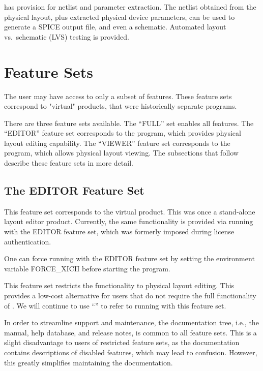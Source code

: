 {\Xic} has provision for netlist and parameter extraction.  The
netlist obtained from the physical layout, plus extracted physical
device parameters, can be used to generate a SPICE output file, and
even a schematic.  Automated layout vs.~schematic (LVS) testing is
provided.

\section{{\Xic} Feature Sets}

The {\Xic} user may have access to only a subset of features.  These
feature sets correspond to "virtual" products, that were historically
separate programs.

There are three feature sets available.  The ``{\vt FULL}'' set enables
all {\Xic} features.  The ``{\vt EDITOR}'' feature set corresponds to the
{\XicII} program, which provides physical layout editing capability.
The ``{\vt VIEWER}'' feature set corresponds to the {\Xiv} program, which
allows physical layout viewing.  The subsections that follow describe these
feature sets in more detail.

\subsection{The EDITOR Feature Set}
This feature set corresponds to the {\XicII} virtual product.  This
was once a stand-alone layout editor product.  Currently, the same
functionality is provided via running {\Xic} with the EDITOR feature
set, which was formerly imposed during license authentication.

One can force running with the EDITOR feature set by setting the
environment variable {\et FORCE\_XICII} before starting the {\Xic}
program.

This feature set restricts the functionality to physical layout
editing.  This provides a low-cost alternative for users that do not
require the full functionality of {\Xic}.  We will continue to use
``{\XicII}'' to refer to {\Xic} running with this feature set.

In order to streamline support and maintenance, the documentation
tree, i.e., the manual, help database, and release notes, is common to
all feature sets.  This is a slight disadvantage to users of
restricted feature sets, as the documentation contains descriptions of
disabled features, which may lead to confusion.  However, this greatly
simplifies maintaining the documentation.

